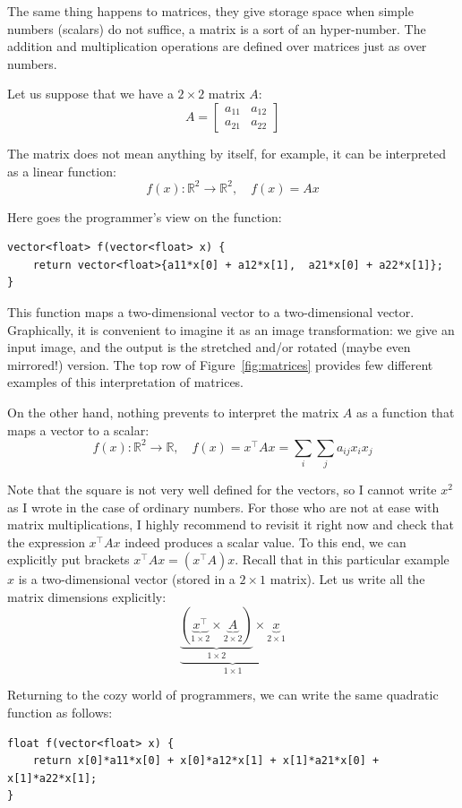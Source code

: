 \documentclass[notitlepage]{report}
\begin{document}
The same thing happens to matrices, they give storage space when simple numbers (scalars) do not suffice, a matrix is a sort of an hyper-number.
The addition and multiplication operations are defined over matrices just as over numbers.

Let us suppose that we have a $2\times 2$ matrix $A$:
$$
A=\begin{bmatrix} a_{11} & a_{12} \\ a_{21} & a_{22}\end{bmatrix}
$$

The matrix does not mean anything by itself, for example, it can be interpreted as a linear function:
$$
f(x) : \mathbb R^2 \rightarrow \mathbb R^2, \quad f(x) = Ax
$$

Here goes the programmer's view on the function:
\begin{verbatim}
vector<float> f(vector<float> x) {
    return vector<float>{a11*x[0] + a12*x[1],  a21*x[0] + a22*x[1]};
}
\end{verbatim}

This function maps a two-dimensional vector to a two-dimensional vector.
Graphically, it is convenient to imagine it as an image transformation: we give an input image, and the output is the stretched and/or rotated (maybe even mirrored!) version.
The top row of Figure~\ref{fig:matrices} provides few different examples of this interpretation of matrices.

On the other hand, nothing prevents to interpret the matrix $A$ as a function that maps a vector to a scalar:
$$
f(x) : \mathbb R^2 \rightarrow \mathbb R, \quad f(x) = x^\top A x = \sum\limits_i\sum\limits_j a_{ij}x_i x_j
$$

Note that the square is not very well defined for the vectors, so I cannot write $x^2$ as I wrote in the case of ordinary numbers. 
For those who are not at ease with matrix multiplications, I highly recommend to revisit it right now and check that the expression $x^\top A x$ indeed produces a scalar value.
To this end, we can explicitly put brackets $x^\top A x = (x^\top A) x$.
Recall that in this particular example $x$ is a two-dimensional vector (stored in a $2\times 1$ matrix).
Let us write all the matrix dimensions explicitly:
$$
\underbrace{\underbrace{\left(\underbrace{x^\top}_{1\times 2} \times \underbrace{A}_{2\times 2}\right)}_{1\times 2} \times \underbrace{x}_{2\times 1}}_{1 \times 1}
$$

Returning to the cozy world of programmers, we can write the same quadratic function as follows:
\begin{verbatim}
float f(vector<float> x) {
    return x[0]*a11*x[0] + x[0]*a12*x[1] + x[1]*a21*x[0] + x[1]*a22*x[1];
}
\end{verbatim}
\end{document}
